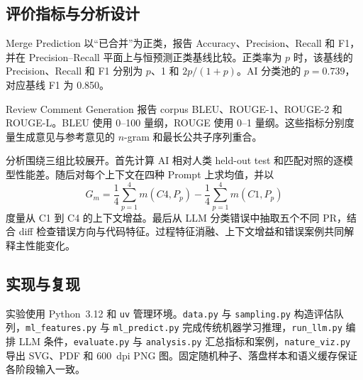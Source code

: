 \documentclass{experimentreport}
\begin{document}
{\subsection{评价指标与分析设计}

Merge Prediction 以“已合并”为正类，报告 Accuracy、Precision、Recall 和 F1，并在 Precision--Recall 平面上与恒预测正类基线比较。正类率为 $p$ 时，该基线的 Precision、Recall 和 F1 分别为 $p$、1 和 $2p/(1+p)$。AI 分类池的 $p=0.739$，对应基线 F1 为 0.850。

Review Comment Generation 报告 corpus BLEU、ROUGE-1、ROUGE-2 和 ROUGE-L。BLEU 使用 0--100 量纲，ROUGE 使用 0--1 量纲。这些指标分别度量生成意见与参考意见的 $n$-gram 和最长公共子序列重合。

分析围绕三组比较展开。首先计算 AI 相对人类 held-out test 和匹配对照的逐模型性能差。随后对每个上下文在四种 Prompt 上求均值，并以
\[
G_m=\frac{1}{4}\sum_{p=1}^{4}m(C4,P_p)-
    \frac{1}{4}\sum_{p=1}^{4}m(C1,P_p)
\]
度量从 C1 到 C4 的上下文增益。最后从 LLM 分类错误中抽取五个不同 PR，结合 diff 检查错误方向与代码特征。过程特征消融、上下文增益和错误案例共同解释主性能变化。

\subsection{实现与复现}

实验使用 Python~3.12 和 \texttt{uv} 管理环境。\texttt{data.py} 与 \texttt{sampling.py} 构造评估队列，\texttt{ml\_features.py} 与 \texttt{ml\_predict.py} 完成传统机器学习推理，\texttt{run\_llm.py} 编排 LLM 条件，\texttt{evaluate.py} 与 \texttt{analysis.py} 汇总指标和案例，\texttt{nature\_viz.py} 导出 SVG、PDF 和 600~dpi PNG 图。固定随机种子、落盘样本和语义缓存保证各阶段输入一致。

}

\end{document}
